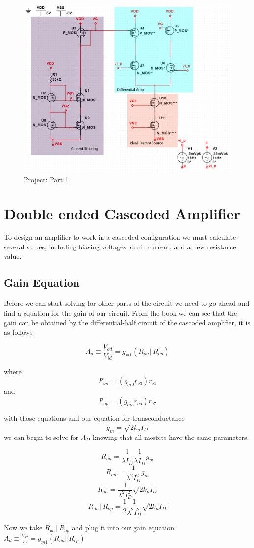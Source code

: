 \documentclass[12pt]{article}
\begin{document}
	
	\begin{figure}[h!]
		\label{fig:amp}
		\caption{Project: Part 1}
		\centering
		\includegraphics[width=.6\textwidth]{photoshop}
	\end{figure}
	
	
	
	
	\section{Double ended Cascoded Amplifier}
	To design an amplifier to work in a cascoded configuration we must calculate several values, including biasing voltages, drain current, and a new resistance value.
	\subsection{Gain Equation}
	Before we can start solving for other parts of the circuit we need to go ahead and find a equation for the gain of our circuit. From the book we can see that the gain can be obtained by the differential-half circuit of the cascoded amplifier, it is as follows
	
	$$A_d \equiv \frac{V_{od}}{V_{id}} = g_{m1} (R_{on}|| R_{op})$$
	
	where
	$$R_{on} = (g_{m3} r_{o3}) r_{o1}$$ 
	and 
	$$R_{op} = (g_{m5} r_{o5}) r_{o7}$$
	
	with those equations and our equation for transconductance 
	$$g_{m} = \sqrt{2 k_n I_D}$$
	we can begin to solve for $A_D$ knowing that all mosfets have the same parameters.
	
	$$R_{on} =\frac{1}{\lambda I_D} \frac{1}{\lambda I_D} g_m$$
	$$R_{on} = \frac{1}{\lambda^2 I_D^2} g_m$$
	$$R_{on} = \frac{1}{\lambda^2 I_D^2} \sqrt{2 k_n I_D}$$
	$$R_{on}|| R_{op} = \frac{1}{2} \frac{1}{\lambda^2 I_D^2} \sqrt{2 k_n I_D}  $$
	
	Now we take $R_{on}|| R_{op}$ and plug it into our gain equation $A_d \equiv \frac{V_{od}}{V_{id}} = g_{m1} (R_{on}|| R_{op})$
	
\end{document}
